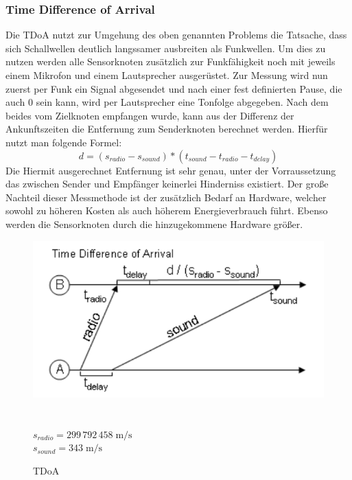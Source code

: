 \subsubsection{Time Difference of Arrival}
Die \ac{TDoA} nutzt zur Umgehung des oben genannten Problems die Tatsache, dass sich Schallwellen deutlich langssamer ausbreiten als Funkwellen. Um dies zu nutzen werden alle Sensorknoten zusätzlich zur Funkfähigkeit noch mit jeweils einem Mikrofon und einem Lautsprecher ausgerüstet. Zur Messung wird nun zuerst per Funk ein Signal abgesendet und nach einer fest definierten Pause, die auch 0 sein kann, wird per Lautsprecher eine Tonfolge abgegeben. Nach dem beides vom Zielknoten empfangen wurde, kann aus der Differenz der Ankunftszeiten die Entfernung zum Senderknoten berechnet werden. Hierfür nutzt man folgende Formel:
\begin{equation}
  \label{eq:TDoA}
    d = (s_{radio} - s_{sound}) * (t_{sound} - t_{radio} - t_{delay})
\end{equation}
Die Hiermit ausgerechnet Entfernung ist sehr genau, unter der Vorraussetzung das zwischen Sender und Empfänger keinerlei Hinderniss existiert. Der große Nachteil dieser Messmethode ist der zusätzlich Bedarf an Hardware, welcher sowohl zu höheren Kosten als auch höherem Energieverbrauch führt. Ebenso werden die Sensorknoten durch die hinzugekommene Hardware größer.
\begin{figure}[h!]
  \caption{TDoA}
   \includegraphics[scale=0.35]{img/tdoa1.png}\\
   \cite{bachrach}\\~\\
   $s_{radio}=299\,792\,458\;\mathrm{m/s}$\\
   $s_{sound}=          343\;\mathrm{m/s}$
   \label{fig:TDoA}
\end{figure}
